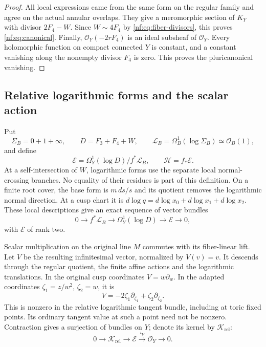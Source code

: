 \begin{proof}
All local expressions came from the same form on the regular
family and agree on the actual annular overlaps. They give a
meromorphic section of $K_Y$ with divisor $2F_4-W$.
Since $W\sim4F_4$ by \eqref{nf:eq:fiber-divisors}, this proves
\eqref{nf:eq:canonical}. Finally,
$\mathcal O_Y(-2rF_4)$ is an ideal subsheaf of $\mathcal O_Y$.
Every holomorphic function on compact connected $Y$ is constant,
and a constant vanishing along the nonempty divisor $F_4$ is zero.
This proves the pluricanonical vanishing.
\end{proof}

\subsection{Relative logarithmic forms and the scalar action}

Put
\[
 \Sigma_B=0+1+\infty,\qquad D=F_3+F_4+W,\qquad
 \mathscr L_B=\Omega_B^1(\log\Sigma_B)\simeq\mathcal O_B(1),
\]
and define
\begin{equation}\label{nf:eq:relative-forms}
 \mathscr E=
 \Omega_Y^1(\log D)/f^*\mathscr L_B,\qquad
 \mathcal H=f_*\mathscr E.
\end{equation}
At a self-intersection of $W$, logarithmic forms use the separate
local normal-crossing branches. No equality of their residues is
part of this definition. On a finite root cover, the base form is
$m\,ds/s$ and its quotient removes the logarithmic normal
direction. At a cusp chart it is
$d\log q=d\log x_0+d\log x_1+d\log x_2$.
These local descriptions give an exact sequence of vector bundles
\begin{equation}\label{nf:eq:absolute-log-sequence}
 0\longrightarrow f^*\mathscr L_B
 \longrightarrow\Omega_Y^1(\log D)
 \longrightarrow\mathscr E\longrightarrow0,
\end{equation}
with $\mathscr E$ of rank two.

Scalar multiplication on the original line $M$ commutes with its
fiber-linear lift. Let $V$ be the resulting infinitesimal vector,
normalized by $V(v)=v$. It descends through the regular quotient,
the finite affine actions and the logarithmic translations.
In the original cusp coordinates $V=w\partial_w$. In the adapted
coordinates $\zeta_1=z/w^2$, $\zeta_2=w$, it is
\begin{equation}\label{nf:eq:scalar-vector}
 V=-2\zeta_1\partial_{\zeta_1}+\zeta_2\partial_{\zeta_2}.
\end{equation}
This is nonzero in the relative logarithmic tangent bundle,
including at toric fixed points. Its ordinary tangent value at
such a point need not be nonzero. Contraction gives a surjection
of bundles on $Y$; denote its kernel by $\mathcal K_{\mathrm{rel}}$:
\begin{equation}\label{nf:eq:scalar-sequence}
 0\longrightarrow\mathcal K_{\mathrm{rel}}
 \longrightarrow\mathscr E\xrightarrow{\ \iota_V\ }
 \mathcal O_Y\longrightarrow0.
\end{equation}

